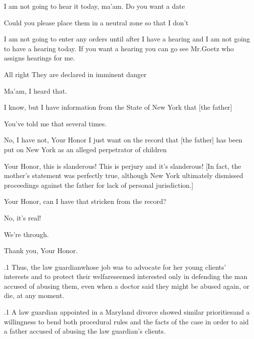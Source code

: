 \documentclass[11pt, twoside]{article}
\begin{document}
{{\begin{docDescription}
I am not going to hear it today, ma’am. Do you want
a date\mdash{}

Could you please place them in a neutral zone so
that I don’t\mdash{}

I am not going to enter any orders until after I have
a hearing and I am not going to have a hearing today.
If you want a hearing you can go see Mr.\@ Goetz who
assigns hearings for me.

All right\ellFour{2pt}{2pt} They are declared in imminent
danger\mdash{}

Ma’am, I heard that.

I know, but I have information from the State of
New York that [the father]\mdash{}

You’ve told me that several times.

No, I have not, Your Honor\ellFour{2pt}{2pt} I just want on
the record that [the father] has been put on New York
as an alleged perpetrator of children\ellFour{2pt}{2pt}

Your Honor, this is slanderous! This is perjury and
it’s slanderous! [In fact, the mother’s statement was perfectly true, although New York ultimately dismissed
proceedings against the father for lack of personal
jurisdiction.]

Your Honor, can I have that stricken
from the record?

No, it’s real!

We’re through.

Thank you, Your Honor.

\end{docDescription}

}%

\p.1{%
Thus, the law guardian\mdash{}whose job was to advocate for her young
clients’ interests and to protect their welfare\mdash{}seemed interested only in
defending the man accused of abusing them, even when a doctor said
they might be abused again, or die, at any moment.
}%

\p.1{%
A law guardian appointed in a Maryland divorce showed similar
priori\-ties\mdash{}and a willingness to bend both procedural rules and the facts
of the case in order to aid a father accused of abusing the law guardian’s clients.
}%

}
\end{document}
